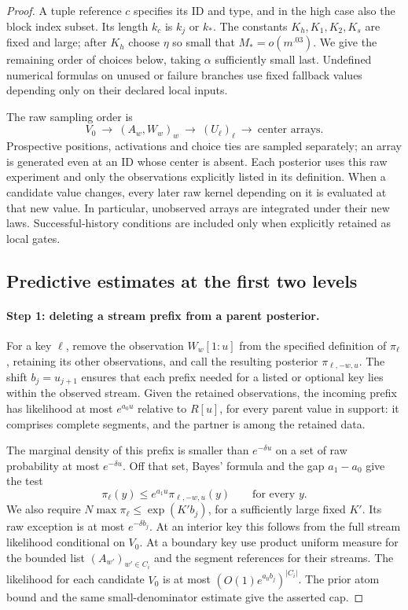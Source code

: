 \begin{proof}
A tuple reference \(c\) specifies its ID and type, and in the high case
also the block index subset. Its length \(k_c\) is \(k_j\) or \(k_*\).
The constants \(K_h,K_1,K_2,K_s\) are fixed and large; after \(K_h\)
choose \(\eta\) so small that \(M_*=o(m^{.03})\). We give the remaining
order of choices below, taking \(\alpha\) sufficiently small last.
Undefined numerical formulas on unused or failure branches use fixed
fallback values depending only on their declared local inputs.

The raw sampling order is
\[
 V_0\ \longrightarrow\ (A_w,W_w)_w\ \longrightarrow\ (U_\ell)_\ell
 \ \longrightarrow\ \text{center arrays}.
\]
Prospective positions, activations and choice ties are sampled separately;
an array is generated even at an ID whose center is absent. Each posterior
uses this raw experiment and only the observations explicitly listed in
its definition. When a candidate value changes, every later raw kernel
depending on it is evaluated at that new value. In particular, unobserved
arrays are integrated under their new laws. Successful-history conditions
are included only when explicitly retained as local gates.

\subsection{Predictive estimates at the first two levels}
\label{sec:predictive-estimates-at-the-first-two-levels}

\paragraph{Step 1: deleting a stream prefix from a parent posterior.}
For a key \(\ell\), remove the observation \(W_w[1:u]\) from the
specified definition of \(\pi_\ell\), retaining its other observations,
and call the resulting posterior \(\pi_{\ell,-w,u}\). The shift
\(b_j=u_{j+1}\) ensures that each prefix needed for a listed or optional
key lies within the observed stream. Given the retained observations,
the incoming prefix has likelihood at most \(e^{a_0u}\) relative to
\(R[u]\), for every parent value in support: it comprises complete
segments, and the partner is among the retained data.

The marginal density of this prefix is smaller than \(e^{-\delta u}\)
on a set of raw probability at most \(e^{-\delta u}\). Off that set,
Bayes' formula and the gap \(a_1-a_0\) give the test
\[
 \pi_\ell(y)\le e^{a_1u}\pi_{\ell,-w,u}(y)
 \qquad\text{for every }y.
\]
We also require
\(N\max\pi_\ell\le\exp(K'b_j)\), for a sufficiently large fixed
\(K'\). Its raw exception is at most \(e^{-\delta b_j}\). At an
interior key this follows from the full stream likelihood conditional
on \(V_0\). At a boundary key use product uniform measure for the
bounded list \((A_{w'})_{w'\in C_i}\) and the segment references for
their streams. The likelihood for each candidate \(V_0\) is at most
\((O(1)e^{a_0b_j})^{|C_i|}\). The prior atom bound and the same
small-denominator estimate give the asserted cap.


\end{proof}
